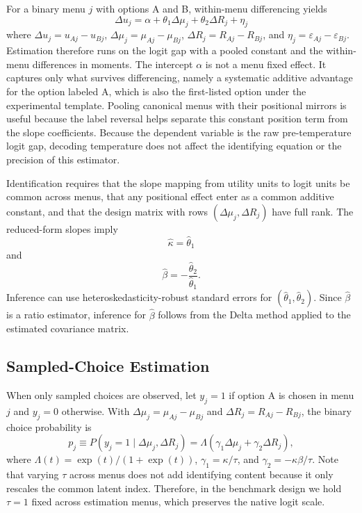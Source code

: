 For a binary menu $j$ with options A and B, within-menu differencing yields
\begin{equation}\label{eq:first-difference}
  \Delta u_j = \alpha + \theta_1 \Delta \mu_j + \theta_2 \Delta R_j + \eta_j
\end{equation}
where $\Delta u_j = u_{Aj} - u_{Bj}$, $\Delta \mu_j = \mu_{Aj} - \mu_{Bj}$, $\Delta R_j = R_{Aj} - R_{Bj}$, and $\eta_j = \varepsilon_{Aj} - \varepsilon_{Bj}$. Estimation therefore runs on the logit gap with a pooled constant and the within-menu differences in moments. The intercept $\alpha$ is not a menu fixed effect. It captures only what survives differencing, namely a systematic additive advantage for the option labeled A, which is also the first-listed option under the experimental template. Pooling canonical menus with their positional mirrors is useful because the label reversal helps separate this constant position term from the slope coefficients.
Because the dependent variable is the raw pre-temperature logit gap, decoding temperature does not affect the identifying equation or the precision of this estimator.

Identification requires that the slope mapping from utility units to logit units be common across menus, that any positional effect enter as a common additive constant, and that the design matrix with rows $(\Delta \mu_j,\Delta R_j)$ have full rank. The reduced-form slopes imply
\begin{equation}\label{eq:kappa-hat}
  \hat{\kappa} = \hat{\theta}_1
\end{equation}
and
\begin{equation}\label{eq:beta-hat}
  \hat{\beta} = -\frac{\hat{\theta}_2}{\hat{\theta}_1}.
\end{equation}
Inference can use heteroskedasticity-robust standard errors for $(\hat{\theta}_1,\hat{\theta}_2)$. Since $\hat{\beta}$ is a ratio estimator, inference for $\hat{\beta}$ follows from the Delta method applied to the estimated covariance matrix.

\subsection{Sampled-Choice Estimation}

When only sampled choices are observed, let $y_j = 1$ if option A is chosen in menu $j$ and $y_j = 0$ otherwise. With $\Delta \mu_j = \mu_{Aj} - \mu_{Bj}$ and $\Delta R_j = R_{Aj} - R_{Bj}$, the binary choice probability is
\begin{equation}\label{eq:revealed-prob}
  p_j \equiv P(y_j = 1 \mid \Delta \mu_j, \Delta R_j)
  = \Lambda(\gamma_1 \Delta \mu_j + \gamma_2 \Delta R_j),
\end{equation}
where $\Lambda(t) = \exp(t) / (1 + \exp(t))$, $\gamma_1 = \kappa / \tau$, and $\gamma_2 = -\kappa\beta / \tau$.
Note that varying $\tau$ across menus does not add identifying content because it only rescales the common latent index. Therefore, in the benchmark design we hold $\tau = 1$ fixed across estimation menus, which preserves the native logit scale.

